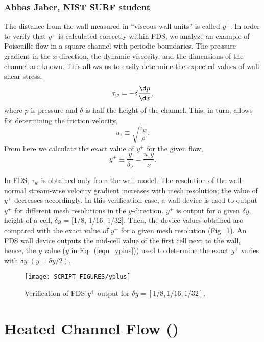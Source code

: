 \documentclass[11pt]{book}
\begin{document}
\subsubsection{Abbas Jaber, NIST SURF student}

\noindent The distance from the wall measured in ``viscous wall units'' is called $y^+$. In order to verify that $y^+$ is calculated correctly within FDS, we analyze an example of Poiseuille flow in a square channel with periodic boundaries. The pressure gradient in the $x$-direction, the dynamic viscosity, and the dimensions of the channel are known. This allows us to easily determine the expected values of wall shear stress,
\begin{equation}
\label{wall stress}
\tau_w = - \delta \frac{\d p}{\d x},
\end{equation}
where $p$ is pressure and $\delta$ is half the height of the channel. This, in turn, allows for determining the friction velocity,
\begin{equation}
\label{friction velocity}
u_{\tau} \equiv \sqrt{{\frac{\tau_w}{\rho}}}.
\end{equation}
From here we calculate the exact value of $y^+$ for the given flow,
\begin{equation}
\label{eqn_yplus}
y^+ \equiv \frac{y}{\delta_{\nu}} = \frac{u_{\tau}y}{\nu}.
\end{equation}

In FDS, $\tau_w$ is obtained only from the wall model. The resolution of the wall-normal stream-wise velocity gradient increases with  mesh resolution; the value of $y^+$ decreases accordingly. In this verification case, a wall device is used to output $y^+$ for different mesh resolutions in the $y$-direction. $y^+$ is output for a given $\delta y$, height of a cell, $\delta y$ = [1/8, 1/16, 1/32]. Then, the device values obtained are compared with the exact value of $y^+$ for a given mesh resolution (Fig.~\ref{fig_yplus}). An FDS wall device outputs the mid-cell value of the first cell next to the wall, hence, the $y$ value ($y$ in Eq.~(\ref{eqn_yplus})) used to determine the exact $y^+$ varies with $\delta y$ $(y = \delta y/2)$.

\begin{figure}[ht]
\centering
\texttt{[image: SCRIPT\_FIGURES/yplus]}
\caption[Near-wall grid resolution]{Verification of FDS $y^+$ output for $\delta y=[1/8, 1/16, 1/32]$.}
\label{fig_yplus}
\end{figure}


\section{Heated Channel Flow (\texorpdfstring{}{heated\_channel})}
\end{document}
